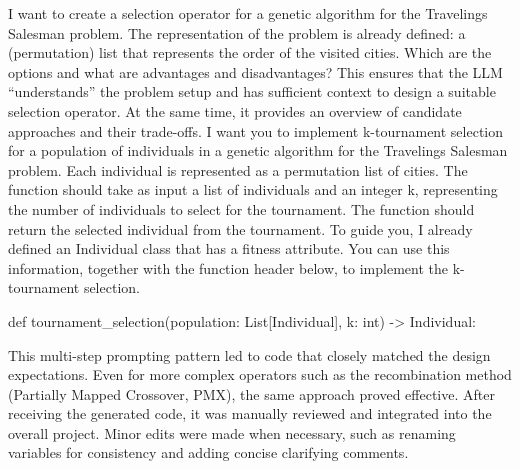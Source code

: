 \documentclass[a4paper,10pt]{article}
\begin{document}
\begin{dialogue}
	I want to create a selection operator for a genetic algorithm for the Travelings Salesman problem. The representation of the problem is already defined: a (permutation) list that represents the order of the visited cities. Which are the options and what are advantages and disadvantages?
	This ensures that the LLM “understands” the problem setup and has sufficient context to design a suitable selection operator. At the same time, it provides an overview of candidate approaches and their trade-offs.
	I want you to implement k-tournament selection for a population of individuals in a genetic algorithm for the Travelings Salesman problem. Each individual is represented as a permutation list of cities. The function should take as input a list of individuals and an integer k, representing the number of individuals to select for the tournament. The function should return the selected individual from the tournament. To guide you, I already defined an Individual class that has a fitness attribute. You can use this information, together with the function header below, to implement the k-tournament selection.
	\begin{python}
		def tournament_selection(population: List[Individual], k: int) -> Individual:
	\end{python}
\end{dialogue}

\noindent
This multi-step prompting pattern led to code that closely matched the design expectations. Even for more complex operators such as the recombination method (Partially Mapped Crossover, PMX), the same approach proved effective. After receiving the generated code, it was manually reviewed and integrated into the overall project. Minor edits were made when necessary, such as renaming variables for consistency and adding concise clarifying comments.

\end{document}
